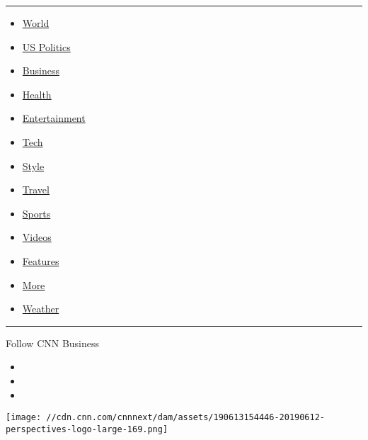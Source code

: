 \begin{center}\rule{0.5\linewidth}{\linethickness}\end{center}

\begin{itemize}
\tightlist
\item
  \href{/world}{World}
\item
  \href{/politics}{US Politics}
\item
  \href{/business}{Business}
\item
  \href{/health}{Health}
\item
  \href{/entertainment}{Entertainment}
\item
  \href{/business/tech}{Tech}
\item
  \href{/style}{Style}
\item
  \href{/travel}{Travel}
\item
  \href{/sport}{Sports}
\item
  \href{/videos}{Videos}
\item
  \href{/specials}{Features}
\item
  \href{/more}{More}
\item
  \href{/weather}{Weather}
\end{itemize}

\begin{center}\rule{0.5\linewidth}{\linethickness}\end{center}

Follow CNN Business

\begin{itemize}
\item
\item
\item
\end{itemize}

\texttt{[image: //cdn.cnn.com/cnnnext/dam/assets/190613154446-20190612-perspectives-logo-large-169.png]}

